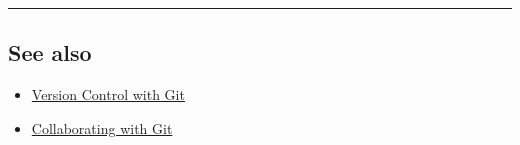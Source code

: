 \documentclass{article}[18pt]
\providecommand{\tightlist}{%
  \setlength{\itemsep}{0pt}\setlength{\parskip}{0pt}}
\begin{document}
\begin{center}\rule{0.5\linewidth}{\linethickness}\end{center}

\hypertarget{see-also}{%
\subsection{See also}\label{see-also}}

\begin{itemize}
\tightlist
\item
  \href{https://swcarpentry.github.io/git-novice/}{Version Control with
  Git}
\item
  \href{https://www.atlassian.com/git/tutorials/syncing}{Collaborating
  with Git}
\end{itemize}
\end{document}
